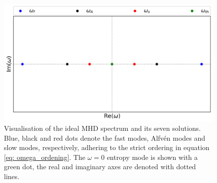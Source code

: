 \begin{figure}[t]
  \centering
  \includegraphics[width=\textwidth]{spectrum_adiabatic.png}
  \caption{
    Visualisation of the ideal MHD spectrum and its seven solutions.
    Blue, black and red dots denote the fast modes, Alfv\'en modes and slow modes, respectively, adhering to the strict ordering in equation \eqref{eq: omega_ordening}. The $\omega = 0$ entropy mode is shown with a green dot, the real and imaginary axes are denoted with dotted lines.
  }
  \label{fig: adiabatic_spectrum}
\end{figure}

